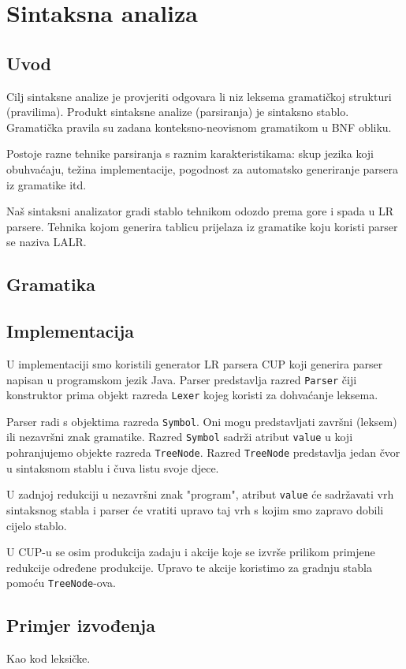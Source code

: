\chapter{Sintaksna analiza}

\section{Uvod}
Cilj sintaksne analize je provjeriti odgovara li niz leksema gramatičkoj strukturi (pravilima). Produkt
sintaksne analize (parsiranja) je sintaksno stablo. Gramatička pravila su zadana konteksno-neovisnom
gramatikom u BNF obliku.

Postoje razne tehnike parsiranja s raznim karakteristikama: skup jezika koji obuhvaćaju, težina
implementacije, pogodnost za automatsko generiranje parsera iz gramatike itd.

Naš sintaksni analizator gradi stablo tehnikom odozdo prema gore i spada u LR parsere. Tehnika
kojom generira tablicu prijelaza iz gramatike koju koristi parser se naziva LALR.

\section{Gramatika}

\section{Implementacija}

U implementaciji smo koristili generator LR parsera CUP koji generira parser napisan u programskom jezik Java.
Parser predstavlja razred \texttt{Parser} čiji konstruktor prima objekt razreda \texttt{Lexer}
kojeg koristi za dohvaćanje leksema.

Parser radi s objektima razreda \texttt{Symbol}. Oni mogu predstavljati završni (leksem) ili nezavršni znak gramatike.
Razred \texttt{Symbol} sadrži atribut \texttt{value} u koji pohranjujemo objekte razreda \texttt{TreeNode}. Razred
\texttt{TreeNode} predstavlja jedan čvor u sintaksnom stablu i čuva listu svoje djece.

U zadnjoj redukciji u nezavršni znak "program", atribut \texttt{value} će sadržavati vrh sintaksnog stabla i parser
će vratiti upravo taj vrh s kojim smo zapravo dobili cijelo stablo.

U CUP-u se osim produkcija zadaju i akcije koje se izvrše prilikom primjene redukcije određene produkcije. Upravo
te akcije koristimo za gradnju stabla pomoću \texttt{TreeNode}-ova. 

\section{Primjer izvođenja}

Kao kod leksičke.
